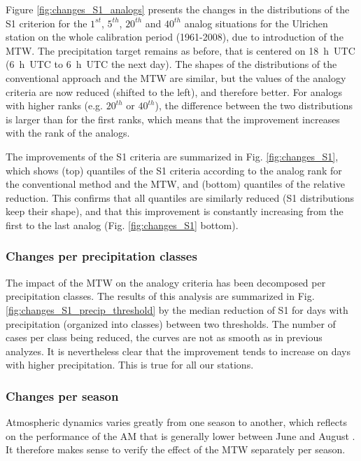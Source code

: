 \documentclass[hess, manuscript]{copernicus}
\begin{document}
Figure \ref{fig:changes_S1_analogs} presents the changes in the distributions of the S1 criterion for the $1^{st}$, $5^{th}$, $20^{th}$ and $40^{th}$ analog situations for the Ulrichen station on the whole calibration period (1961-2008), due to introduction of the MTW. The precipitation target remains as before, that is centered on 18~h~UTC (6~h~UTC to 6~h~UTC the next day). The shapes of the distributions of the conventional approach and the MTW are similar, but the values of the analogy criteria are now reduced (shifted to the left), and therefore better. For analogs with higher ranks (e.g. $20^{th}$ or $40^{th}$), the difference between the two distributions is larger than for the first ranks, which means that the improvement increases with the rank of the analogs. 

The improvements of the S1 criteria are summarized in Fig. \ref{fig:changes_S1}, which shows (top) quantiles of the S1 criteria according to the analog rank for the conventional method and the MTW, and (bottom) quantiles of the relative reduction. This confirms that all quantiles are similarly reduced (S1 distributions keep their shape), and that this improvement is constantly increasing from the first to the last analog (Fig. \ref{fig:changes_S1} bottom).


\subsubsection{Changes per precipitation classes}
\label{sec:influence_precip}

The impact of the MTW on the analogy criteria has been decomposed per precipitation classes. The results of this analysis are summarized in Fig. \ref{fig:changes_S1_precip_threshold} by the median reduction of S1 for days with precipitation (organized into classes) between two thresholds. The number of cases per class being reduced, the curves are not as smooth as in previous analyzes. It is nevertheless clear that the improvement tends to increase on days with higher precipitation. This is true for all our stations.


\subsubsection{Changes per season}
\label{sec:seasonal_effect}

Atmospheric dynamics varies greatly from one season to another, which reflects on the performance of the AM that is generally lower between June and August \citep{Bliefernicht2010}. It therefore makes sense to verify the effect of the MTW separately per season.
\end{document}
